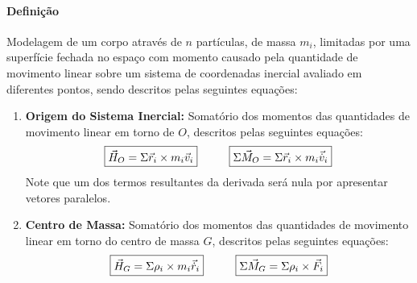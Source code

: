 \documentclass{article}
\begin{document}
            \paragraph{Definição}Modelagem de um corpo através de $n$ partículas, de massa $m_{i}$, limitadas por uma superfície fechada no espaço com momento causado pela quantidade de movimento linear sobre um sistema de coordenadas inercial avaliado em diferentes pontos, sendo descritos pelas seguintes equações:
                \begin{enumerate}[rightmargin = \leftmargin]
                    \item \textbf{Origem do Sistema Inercial:} Somatório dos momentos das quantidades de movimento linear em torno de $O$, descritos pelas seguintes equações:
                        \begin{equation}
                            \boxed{
                                \vec{H}_{O} = \Sigma \vec{r}_{i}\times m_{i}\vec{v}_{i}
                            }
                            \hspace{10mm}
                            \boxed{
                                \Sigma\vec{M}_{O} = 
                                \Sigma\vec{r}_{i}\times m_{i}\vec{\dot{v}}_{i}
                            }
                        \end{equation}
                    Note que um dos termos resultantes da derivada será nula por apresentar vetores paralelos.

                    \item \textbf{Centro de Massa:} Somatório dos momentos das quantidades de movimento linear em torno do centro de massa $G$, descritos pelas seguintes equações:
                        \begin{equation}
                            \boxed{
                                \vec{H}_{G} = \Sigma  \rho_{i}\times m_{i}\vec{\dot{r}}_{i}
                            }
                            \hspace{10mm}
                            \boxed{
                                \Sigma \vec{M}_{G} = 
                                \Sigma \rho_{i}\times\vec{F}_{i}
                            }
                        \end{equation}


\end{enumerate}
\end{document}
